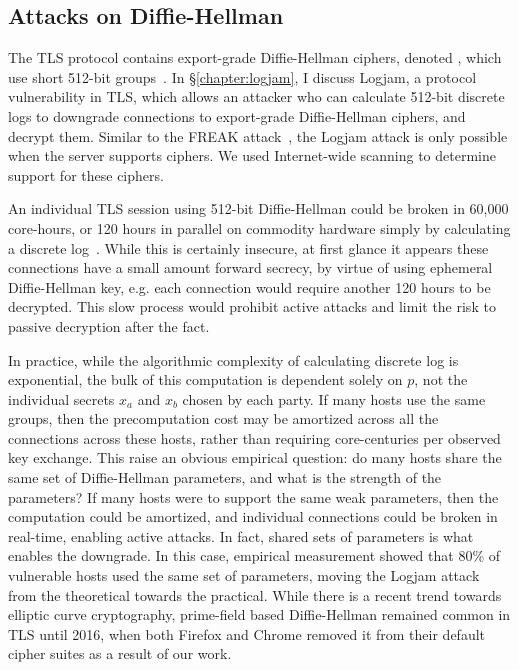 \subsection{Attacks on Diffie-Hellman}

The TLS protocol contains export-grade Diffie-Hellman ciphers, denoted
\dheexp{}, which use short 512-bit groups~\cite{rfc2246}. In
\S\ref{chapter:logjam}, I discuss Logjam, a protocol vulnerability in TLS,
which allows an attacker who can calculate 512-bit discrete logs to downgrade
connections to export-grade Diffie-Hellman ciphers, and decrypt them. Similar
to the FREAK attack~\cite{freak-attack-2015}, the Logjam attack is only
possible when the server supports \dheexp{} ciphers. We used Internet-wide
scanning to determine support for these ciphers.

An individual TLS session using 512-bit Diffie-Hellman could be broken in
60,000 core-hours, or 120 hours in parallel on commodity hardware simply by
calculating a discrete log~\cite{logjam-2015}. While this is certainly
insecure, at first glance it appears these connections have a small amount
forward secrecy, by virtue of using ephemeral Diffie-Hellman key, e.g. each
connection would require another 120 hours to be decrypted. This slow process
would prohibit active attacks and limit the risk to passive decryption after
the fact.

In practice, while the algorithmic complexity of calculating discrete log is
exponential, the bulk of this computation is dependent solely on $p$, not
the individual secrets $x_a$ and $x_b$ chosen by each party. If many hosts use
the same groups, then the precomputation cost may be amortized across all the
connections across these hosts, rather than requiring core-centuries per
observed key exchange. This raise an obvious empirical question: do many
hosts share the same set of Diffie-Hellman parameters, and what is the
strength of the parameters? If many hosts were to support the same weak
parameters, then the computation could be amortized, and individual
connections could be broken in real-time, enabling active attacks. In fact,
shared sets of parameters is what enables the downgrade. In this case,
empirical measurement showed that 80\% of vulnerable hosts used the same set
of parameters, moving the Logjam attack from the theoretical towards the
practical. While there is a recent trend towards elliptic curve cryptography,
prime-field based Diffie-Hellman remained common in TLS until 2016, when both
Firefox and Chrome removed it from their default cipher suites as a result of
our work.

